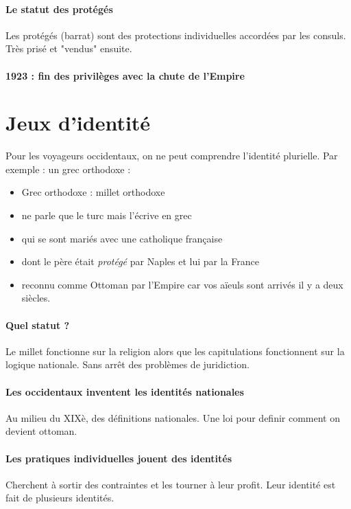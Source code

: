 \paragraph{Le statut des protégés} Les protégés (barrat) sont des protections individuelles accordées par les consuls. Très prisé et "vendus" ensuite.

\paragraph{1923 : fin des privilèges avec la chute de l'Empire} 



\section{Jeux d'identité}

Pour les voyageurs occidentaux, on ne peut comprendre l'identité plurielle.
Par exemple : un grec orthodoxe : 
\begin{itemize}
    \item Grec orthodoxe : millet orthodoxe
    \item ne parle que le turc mais l'écrive en grec
    \item qui se sont mariés avec une catholique française
    \item dont le père était \textit{protégé} par Naples et lui par la France
    \item reconnu comme Ottoman par l'Empire car vos aïeuls sont arrivés il y a deux siècles. 
\end{itemize}
\paragraph{Quel statut ?}
 Le millet fonctionne sur la religion alors que les capitulations fonctionnent sur la logique nationale. Sans arrêt des problèmes de juridiction.

 \paragraph{Les occidentaux inventent les identités nationales}
 Au milieu du XIXè, des définitions nationales. Une loi pour definir comment on devient ottoman.

 \paragraph{Les pratiques individuelles jouent des identités} Cherchent à sortir des contraintes et les tourner à leur profit. Leur identité est fait de plusieurs identités. 

